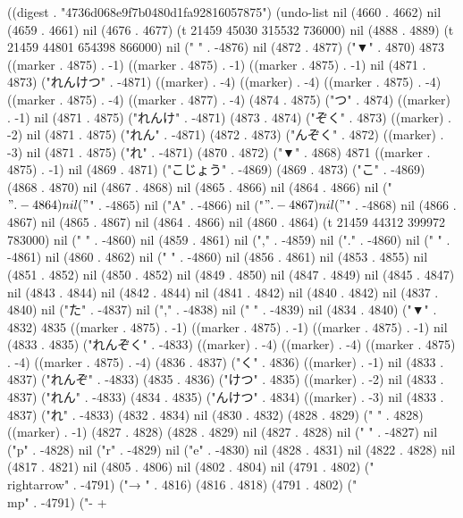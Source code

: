 
((digest . "4736d068e9f7b0480d1fa92816057875") (undo-list nil (4660 . 4662) nil (4659 . 4661) nil (4676 . 4677) (t 21459 45030 315532 736000) nil (4888 . 4889) (t 21459 44801 654398 866000) nil (" " . -4876) nil (4872 . 4877) ("▼" . 4870) 4873 ((marker . 4875) . -1) ((marker . 4875) . -1) ((marker . 4875) . -1) nil (4871 . 4873) ("れんけつ" . -4871) ((marker) . -4) ((marker) . -4) ((marker . 4875) . -4) ((marker . 4875) . -4) ((marker . 4877) . -4) (4874 . 4875) ("つ" . 4874) ((marker) . -1) nil (4871 . 4875) ("れんけ" . -4871) (4873 . 4874) ("ぞく" . 4873) ((marker) . -2) nil (4871 . 4875) ("れん" . -4871) (4872 . 4873) ("んぞく" . 4872) ((marker) . -3) nil (4871 . 4875) ("れ" . -4871) (4870 . 4872) ("▼" . 4868) 4871 ((marker . 4875) . -1) nil (4869 . 4871) ("こじょう" . -4869) (4869 . 4873) ("こ" . -4869) (4868 . 4870) nil (4867 . 4868) nil (4865 . 4866) nil (4864 . 4866) nil ("$" . -4864) nil ("$" . -4865) nil ("A" . -4866) nil ("$" . -4867) nil ("$" . -4868) nil (4866 . 4867) nil (4865 . 4867) nil (4864 . 4866) nil (4860 . 4864) (t 21459 44312 399972 783000) nil (" " . -4860) nil (4859 . 4861) nil ("," . -4859) nil ("." . -4860) nil (" " . -4861) nil (4860 . 4862) nil (" " . -4860) nil (4856 . 4861) nil (4853 . 4855) nil (4851 . 4852) nil (4850 . 4852) nil (4849 . 4850) nil (4847 . 4849) nil (4845 . 4847) nil (4843 . 4844) nil (4842 . 4844) nil (4841 . 4842) nil (4840 . 4842) nil (4837 . 4840) nil ("た" . -4837) nil ("," . -4838) nil (" " . -4839) nil (4834 . 4840) ("▼" . 4832) 4835 ((marker . 4875) . -1) ((marker . 4875) . -1) ((marker . 4875) . -1) nil (4833 . 4835) ("れんぞく" . -4833) ((marker) . -4) ((marker) . -4) ((marker . 4875) . -4) ((marker . 4875) . -4) (4836 . 4837) ("く" . 4836) ((marker) . -1) nil (4833 . 4837) ("れんぞ" . -4833) (4835 . 4836) ("けつ" . 4835) ((marker) . -2) nil (4833 . 4837) ("れん" . -4833) (4834 . 4835) ("んけつ" . 4834) ((marker) . -3) nil (4833 . 4837) ("れ" . -4833) (4832 . 4834) nil (4830 . 4832) (4828 . 4829) (" " . 4828) ((marker) . -1) (4827 . 4828) (4828 . 4829) nil (4827 . 4828) nil (" " . -4827) nil ("p" . -4828) nil ("r" . -4829) nil ("e" . -4830) nil (4828 . 4831) nil (4822 . 4828) nil (4817 . 4821) nil (4805 . 4806) nil (4802 . 4804) nil (4791 . 4802) ("\\rightarrow" . -4791) ("→
" . 4816) (4816 . 4818) (4791 . 4802) ("\\mp" . -4791) ("-
+
